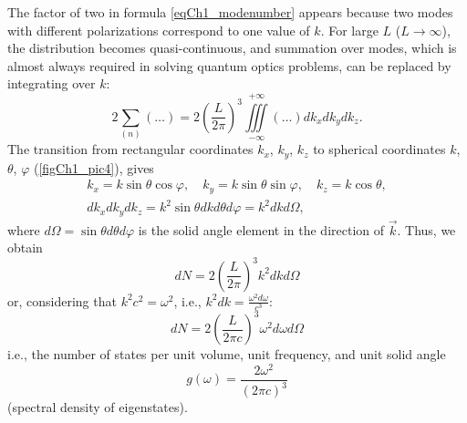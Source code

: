 The factor of two in formula \eqref{eqCh1_modenumber} appears because two modes with different polarizations correspond to one value of $k$. For large $L$ ($L\rightarrow \infty$), the distribution becomes quasi-continuous, and summation over modes, which is almost always required in solving quantum optics problems, can be replaced by integrating over $k$: 
\begin{equation}
2 \sum_{(n)} \left( \dots \right) = 2 \left(\frac{L}{2 \pi} \right)^3
\iiint\limits_{-\infty}^{+\infty} \left( \dots \right) d k_x d k_y d k_z.
\label{eqCh1_modenumber_kvazy_contig}
\end{equation}
The transition from rectangular coordinates $k_x$, $k_y$, $k_z$ to spherical coordinates $k$, $\theta$, $\varphi$ (\autoref{figCh1_pic4}), gives
\begin{eqnarray}
k_x = k \sin \theta \cos \varphi,
\quad 
k_y = k \sin \theta \sin \varphi,
\quad 
k_z  = k \cos \theta,
\nonumber \\
d k_x d k_y d k_z = k^2 \sin \theta d k d \theta d \varphi = k^2 d k
d \Omega,
\end{eqnarray}
where $d \Omega = \sin \theta d \theta d \varphi$ is the solid angle element in the direction of $\vec{k}$. Thus, we obtain
\begin{equation}
d N = 2 \left(\frac{L}{2 \pi} \right)^3 k^2 d k d \Omega
\label{eqCh1_modenumber_1pre}
\end{equation}
or, considering that $k^2 c^2 = \omega^2$, i.e., $k^2 d k = \frac{\omega^2 d \omega}{c^3}$: 
\begin{equation}
d N = 2 \left(\frac{L}{2 \pi c} \right)^3 \omega^2 d \omega d \Omega
\label{eqCh1_modenumber_1}
\end{equation}
i.e., the number of states per unit volume, unit frequency, and unit solid angle
\begin{equation}
g\left(\omega\right)  = \frac{2 \omega^2}{\left(2 \pi c\right)^3}
\end{equation}
(spectral density of eigenstates). 